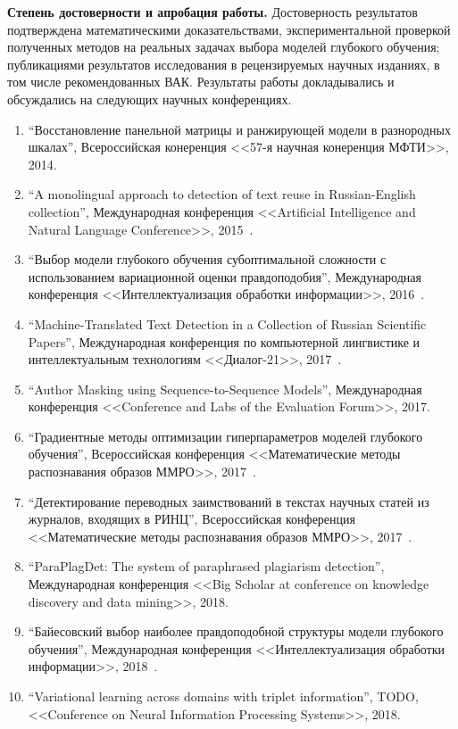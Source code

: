 \vspace{0.5cm}
\textbf{Степень достоверности и апробация работы.} Достоверность результатов подтверждена математическими доказательствами, экспериментальной проверкой полученных методов на реальных задачах выбора моделей глубокого обучения; публикациями результатов исследования в рецензируемых научных изданиях, в том числе рекомендованных ВАК. Результаты работы докладывались и обсуждались на следующих научных конференциях.
\begin{enumerate}
\item ``Восстановление панельной матрицы и ранжирующей модели в разнородных шкалах'', Всероссийская конеренция <<57-я научная конеренция МФТИ>>, 2014.
\item ``A monolingual approach to detection of text reuse in Russian-English collection'', Международная конференция <<Artificial Intelligence and Natural Language Conference>>, 2015~\cite{monolingual}.
\item ``Выбор модели глубокого обучения субоптимальной сложности с использованием вариационной оценки правдоподобия'', Международная конференция <<Интеллектуализация обработки информации>>, 2016~\cite{ioi16}.
\item ``Machine-Translated Text Detection in a Collection of Russian
Scientific Papers'', Международная конференция по компьютерной лингвистике и интеллектуальным технологиям <<Диалог-21>>, 2017~\cite{dialog}.
\item ``Author Masking using Sequence-to-Sequence Models'', Международная конференция <<Conference and Labs of the Evaluation Forum>>, 2017.
\item ``Градиентные методы оптимизации гиперпараметров моделей глубокого обучения'', Всероссийская конференция <<Математические методы распознавания образов ММРО>>, 2017~\cite{mmro17_hyper}.
\item ``Детектирование переводных заимствований в текстах научных статей из журналов, входящих в РИНЦ'', Всероссийская конференция <<Математические методы распознавания образов ММРО>>, 2017~\cite{mmro17_plag}.
\item ``ParaPlagDet: The system of paraphrased plagiarism detection'', Международная конференция <<Big Scholar at conference on knowledge discovery and data mining>>, 2018.
\item ``Байесовский выбор наиболее правдоподобной структуры модели глубокого обучения'', Международная конференция <<Интеллектуализация обработки информации>>, 2018~\cite{ioi18}.
\item ``Variational learning across domains with triplet
information'', TODO, <<Conference on Neural Information Processing Systems>>, 2018.
\end{enumerate}

